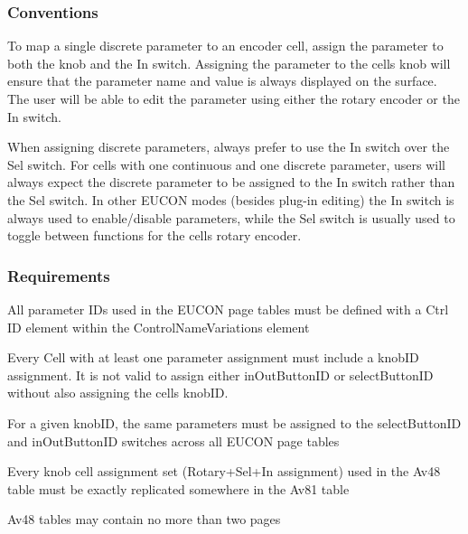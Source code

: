 \hypertarget{a00363_subsection_eucon_page_tables_conventions}{}\subsubsection{Conventions}\label{a00363_subsection_eucon_page_tables_conventions}
 
\begin{DoxyItemize}
\item To map a single discrete parameter to an encoder cell, assign the parameter to both the knob and the In switch. Assigning the parameter to the cell\textquotesingle{}s knob will ensure that the parameter name and value is always displayed on the surface. The user will be able to edit the parameter using either the rotary encoder or the In switch.  
\item When assigning discrete parameters, always prefer to use the In switch over the Sel switch. For cells with one continuous and one discrete parameter, users will always expect the discrete parameter to be assigned to the In switch rather than the Sel switch. In other E\+U\+C\+O\+N modes (besides plug-\/in editing) the In switch is always used to enable/disable parameters, while the Sel switch is usually used to toggle between functions for the cell\textquotesingle{}s rotary encoder.  
\end{DoxyItemize}

\hypertarget{a00363_subsection_eucon_page_tables_requirements}{}\subsubsection{Requirements}\label{a00363_subsection_eucon_page_tables_requirements}
 
\begin{DoxyItemize}
\item All parameter I\+Ds used in the E\+U\+C\+O\+N page tables must be defined with a {\ttfamily Ctrl I\+D} element within the {\ttfamily Control\+Name\+Variations} element  
\item Every {\ttfamily Cell} with at least one parameter assignment must include a {\ttfamily knob\+I\+D} assignment. It is not valid to assign either {\ttfamily in\+Out\+Button\+I\+D} or {\ttfamily select\+Button\+I\+D} without also assigning the cell\textquotesingle{}s {\ttfamily knob\+I\+D}.  
\item For a given {\ttfamily knob\+I\+D}, the same parameters must be assigned to the {\ttfamily select\+Button\+I\+D} and {\ttfamily in\+Out\+Button\+I\+D} switches across all E\+U\+C\+O\+N page tables  
\item Every knob cell assignment set (Rotary+\+Sel+\+In assignment) used in the {\ttfamily \textquotesingle{}Av48\textquotesingle{}} table must be exactly replicated somewhere in the {\ttfamily \textquotesingle{}Av81\textquotesingle{}} table  
\item {\ttfamily \textquotesingle{}Av48\textquotesingle{}} tables may contain no more than two pages  
\end{DoxyItemize}



